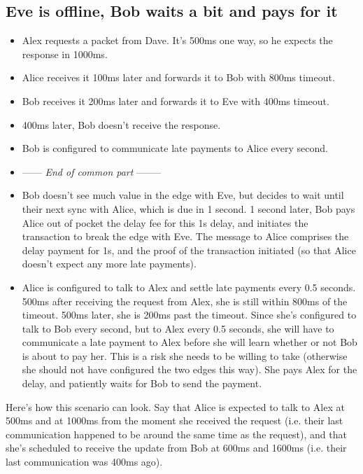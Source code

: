 \documentclass{article}
\newcommand{\textapprox}{\raisebox{0.5ex}{\texttildelow}}
\begin{document}
\subsection{Eve is offline, Bob waits a bit and pays for it}

\begin{itemize}
    \item Alex requests a packet from Dave. It's 500ms one way, so he expects the response in 1000ms.
    \item Alice receives it 100ms later and forwards it to Bob with 800ms timeout.
    \item Bob receives it 200ms later and forwards it to Eve with 400ms timeout.
    \item 400ms later, Bob doesn't receive the response.
    \item Bob is configured to communicate late payments to Alice every second.
    \item ------ \textit{End of common part} --------
    \item Bob doesn't see much value in the edge with Eve, but decides to wait until their next sync with Alice, which is due in \textapprox 1 second. \textapprox 1 second later, Bob pays Alice out of pocket the delay fee for this \textapprox 1s delay, and initiates the transaction to break the edge with Eve. The message to Alice comprises the delay payment for \textapprox 1s, and the proof of the transaction initiated (so that Alice doesn't expect any more late payments).
    \item Alice is configured to talk to Alex and settle late payments every 0.5 seconds. 500ms after receiving the request from Alex, she is still within 800ms of the timeout. 500ms later, she is 200ms past the timeout. Since she's configured to talk to Bob every second, but to Alex every 0.5 seconds, she will have to communicate a late payment to Alex before she will learn whether or not Bob is about to pay her. This is a risk she needs to be willing to take (otherwise she should not have configured the two edges this way). She pays Alex for the delay, and patiently waits for Bob to send the payment.
\end{itemize}

Here's how this scenario can look. Say that Alice is expected to talk to Alex at 500ms and at 1000ms from the moment she received the request (i.e. their last communication happened to be around the same time as the request), and that she's scheduled to receive the update from Bob at 600ms and 1600ms (i.e. their last communication was \textapprox 400ms ago).
\end{document}
